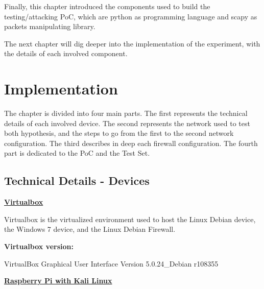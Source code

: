 \documentclass[12pt]{article}
\begin{document}
Finally, this chapter introduced the components used to build the testing/attacking PoC, which are python as programming language and scapy as packets manipulating library.

The next chapter will dig deeper into the implementation of the experiment, with the details of each involved component.

\pagebreak

\section{Implementation}
\label{sec:4}

The chapter is divided into four main parts. The first represents the technical details of each involved device. The second represents the network used to test both hypothesis, and the steps to go from the first to the second network configuration. The third describes in deep each firewall configuration. The fourth part is dedicated to the PoC and the Test Set.

\subsection{Technical Details - Devices}
\label{sub:technicalDetDev}

\textbf{\underline{Virtualbox}}

\vspace{-10pt}
Virtualbox is the virtualized environment used to host the Linux Debian device, the Windows 7 device, and the Linux Debian Firewall.

\textbf{Virtualbox version:} 

\vspace{-15pt}
VirtualBox Graphical User Interface Version 5.0.24_Debian r108355

\textbf{\underline{Raspberry Pi with Kali Linux}}


\begin{savenotes}
\begin{table}[!htpb]
\centering
\addtolength{\tabcolsep}{1pt}
\noindent{}
\caption{Raspberry Pi implementation}
\label{table:raspImpl}
\end{table}
\end{savenotes}
\end{document}
